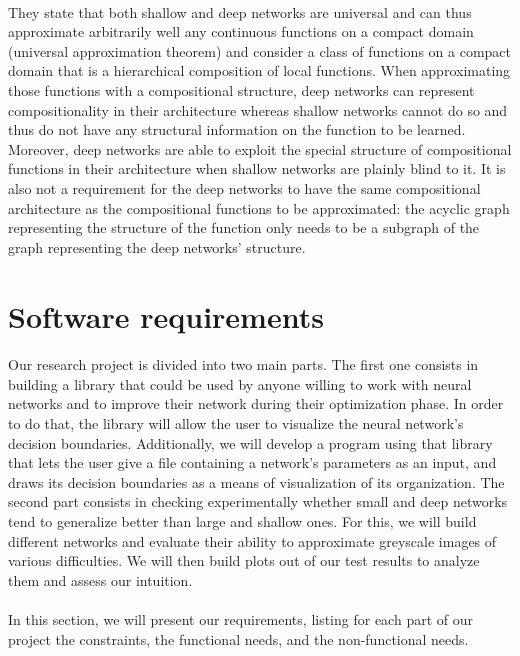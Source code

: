 \documentclass[a4paper]{article}
\begin{document}
\paragraph{}They state that both shallow and deep networks are universal and can thus approximate arbitrarily well any continuous functions on a compact domain (universal approximation theorem) and consider a class of functions on a compact domain that is a hierarchical composition of local functions. When approximating those functions with a compositional structure, deep networks can represent compositionality in their architecture whereas shallow networks cannot do so and thus do not have any structural information on the function to be learned. Moreover, deep networks are able to exploit the special structure of compositional functions in their architecture when shallow networks are plainly blind to it. It is also not a requirement for the deep networks to have the same compositional architecture as the compositional functions to be approximated: the acyclic graph representing the structure of the function only needs to be a subgraph of the graph representing the deep networks' structure.

\section{Software requirements}
\paragraph{}Our research project is divided into two main parts. The first one consists in building a library that could be used by anyone willing to work with neural networks and to improve their network during their optimization phase. In order to do that, the library will allow the user to visualize the neural network's decision boundaries. Additionally, we will develop a program using that library that lets the user give a file containing a network's parameters as an input, and draws its decision boundaries as a means of visualization of its organization. The second part consists in checking experimentally whether small and deep networks tend to generalize better than large and shallow ones. For this, we will build different networks and evaluate their ability to approximate greyscale images of various difficulties. We will then build plots out of our test results to analyze them and assess our intuition.

\paragraph{}In this section, we will present our requirements, listing for each part of our project the constraints, the functional needs, and the non-functional needs. 
\end{document}

